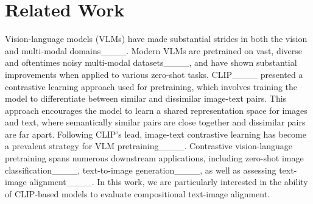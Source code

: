 \section{Related Work}
Vision-language models (VLMs) have made substantial strides in both the vision and multi-modal domains____. Modern VLMs are pretrained on vast, diverse and oftentimes noisy multi-modal datasets____, and have shown substantial improvements when applied to various zero-shot tasks. CLIP____ presented a contrastive learning approach used for pretraining, which involves training the model to differentiate between similar and dissimilar image-text pairs. This approach encourages the model to learn a shared representation space for images and text, where semantically similar pairs are close together and dissimilar pairs are far apart. Following CLIP's lead, image-text contrastive learning has become a prevalent strategy for VLM pretraining____. Contrastive vision-language pretraining spans numerous downstream applications, including zero-shot image classification____,  text-to-image generation____, as well as assessing text-image alignment____. In this work, we are particularly interested in the ability of CLIP-based models to evaluate compositional text-image alignment.

\iffalse
Contrastive-Language Image Pretraining (CLIP)____ models are trained by defining an image and its corresponding caption as positive pairs while the same image and all the other captions present in a mini-batch are defined as negative pairs. By discriminating the positive pair from the negative one, CLIP models can learn an alignment between visual clues in images and text. Despite having impressive results on zero-shot object detection tasks, such approach has been shown to be limited in learning more abstract concepts such as relations between objects or attributes____.
\fi

